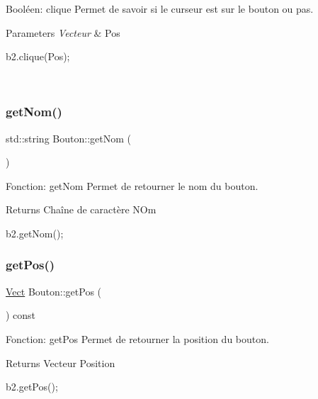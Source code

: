 Booléen\+: clique Permet de savoir si le curseur est sur le bouton ou pas. 


\begin{DoxyParams}{Parameters}
{\em Vecteur} & Pos 
\begin{DoxyCode}
b2.clique(Pos);
\end{DoxyCode}
 \\
\hline
\end{DoxyParams}
\mbox{\label{classBouton_a84818c161e6ea4ee6d58ccc53d57d802}} 
\subsubsection{\texorpdfstring{get\+Nom()}{getNom()}}
{\footnotesize\ttfamily std\+::string Bouton\+::get\+Nom (\begin{DoxyParamCaption}{ }\end{DoxyParamCaption})}



Fonction\+: get\+Nom Permet de retourner le nom du bouton. 

\begin{DoxyReturn}{Returns}
Chaîne de caractère N\+Om 
\begin{DoxyCode}
b2.getNom();
\end{DoxyCode}
 
\end{DoxyReturn}
\mbox{\label{classBouton_aed3d0897774100bd880276bd2e73db27}} 
\subsubsection{\texorpdfstring{get\+Pos()}{getPos()}}
{\footnotesize\ttfamily \hyperlink{classVect}{Vect} Bouton\+::get\+Pos (\begin{DoxyParamCaption}{ }\end{DoxyParamCaption}) const}



Fonction\+: get\+Pos Permet de retourner la position du bouton. 

\begin{DoxyReturn}{Returns}
Vecteur Position 
\begin{DoxyCode}
b2.getPos();
\end{DoxyCode}
 
\end{DoxyReturn}
\mbox{\label{classBouton_ab29ffdc7229d4d702f8dc6498ae08f20}} 
